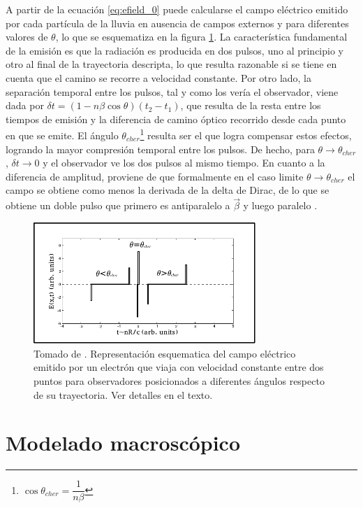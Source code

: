 	A partir de la ecuaci\'on \ref{eq:efield_0} puede calcularse el campo el\'ectrico emitido por cada part\'icula de la lluvia en ausencia de campos externos y para diferentes valores de $\theta$, lo que se esquematiza en la figura \ref{fig:zhs_pulse}.
	La caracter\'istica fundamental de la emisi\'on es que la radiaci\'on es producida en dos pulsos, uno al principio y otro al final de la trayectoria descripta, lo que resulta razonable si se tiene en cuenta que el camino se recorre a velocidad constante.
	Por otro lado, la separaci\'on temporal entre los pulsos, tal y como los ver\'ia el observador, viene dada por $\delta t = (1-n\beta\cos\theta)(t_2-t_1)$, que resulta de la resta entre los tiempos de emisi\'on y la diferencia de camino \'optico recorrido desde cada punto en que se emite.
	El \'angulo \cher{} $\theta_{cher}$\footnote{$\cos\theta_{cher}=\dfrac{1}{n\beta}$} resulta ser el que logra compensar estos efectos, logrando la mayor compresi\'on temporal entre los pulsos.
	De hecho, para $\theta\rightarrow\theta_{cher}$, $\delta t \rightarrow 0$ y el observador ve los dos pulsos al mismo tiempo.
	En cuanto a la diferencia de amplitud, proviene de que formalmente en el caso limite $\theta\rightarrow\theta_{cher}$ el campo se obtiene como menos la derivada de la delta de Dirac, de lo que se obtiene un doble pulso que primero es antiparalelo a $\vec\beta$ y luego paralelo \cite{alvarez:2013}.
	\begin{figure}[ht!]
		\centering
		\includegraphics[width=0.75\textwidth]{fig/EASRadio/zhs_pulse}
		\caption{\label{fig:zhs_pulse} Tomado de \cite{alvarez:2013}. Representaci\'on esquematica del campo el\'ectrico emitido por un electr\'on que viaja con velocidad constante entre dos puntos para observadores posicionados a diferentes \'angulos respecto de su trayectoria. Ver detalles en el texto.}
	\end{figure}
	
	
\section{Modelado macrosc\'opico}
\label{sc:macroscopico}


